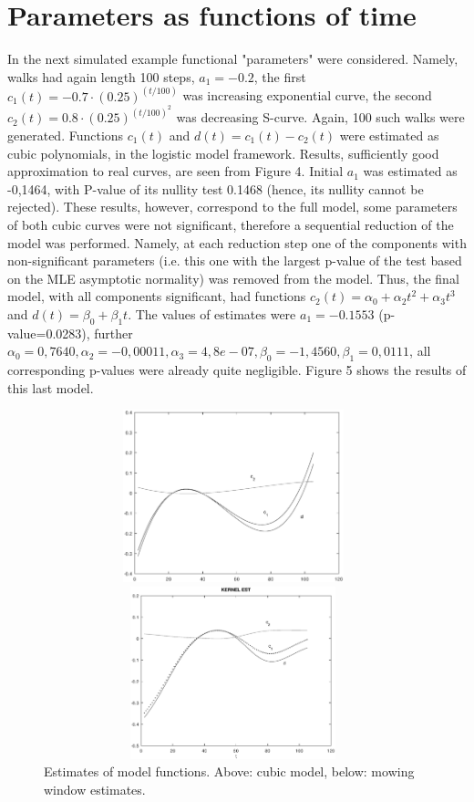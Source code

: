 \documentclass[11pt]{article}
\begin{document}
\section{Parameters as functions of time}

In the next simulated example functional "parameters" were
considered. Namely, walks had again length 100 steps, $a_1=-0.2$,
the first $c_1(t)=-0.7\cdot (0.25)^{(t/100)}$ was increasing
exponential curve, the second $c_2(t)=0.8\cdot (0.25)^{(t/100)^2}$
was decreasing S-curve. Again, 100 such walks were generated.
Functions $c_1(t)$ and $d(t)=c_1(t)-c_2(t)$ were estimated as
cubic polynomials, in the logistic model framework. Results,
sufficiently good approximation to real curves, are seen from
Figure 4. Initial $a_1$ was estimated as -0,1464, with P-value of
its nullity test 0.1468 (hence, its nullity cannot be rejected).
These results, however, correspond to the full model, some
parameters of both cubic curves were not significant, therefore a
sequential reduction of the model was performed. Namely, at each
reduction step one of the components with non-significant
parameters (i.e. this one with the largest p-value of the test
based on the MLE asymptotic normality) was removed from the model.
Thus, the final model, with all components significant, had
functions $c_2(t)=\alpha_0+\alpha_2 t^2+\alpha_3 t^3$ and
$d(t)=\beta_0+\beta_1 t$. The values of estimates were
$a_1=-0.1553$ (p-value=0.0283), further $\alpha_0=0,7640,
\alpha_2= -0,00011, \alpha_3=4,8e-07, \beta_0=-1,4560,
\beta_1=0,0111$, all corresponding p-values were already quite
negligible. Figure 5 shows the results of this last model.


\begin{figure}[h]
\centering
    \includegraphics[width = 11cm,height=5cm]{comp_polyn.eps}

\centering
   \includegraphics[width = 11cm,height=5cm]{comp_kern.eps}
\caption{Estimates of model functions. Above: cubic model, below: mowing window estimates.}
\end{figure}
\end{document}
